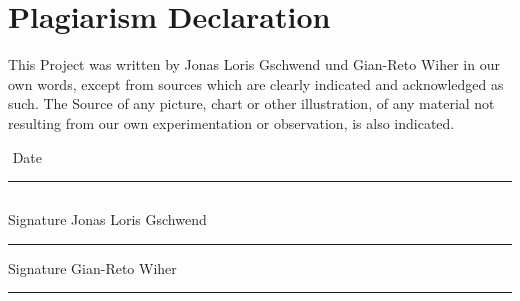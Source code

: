 \chapter*{Plagiarism Declaration}
This Project was written by Jonas Loris Gschwend und Gian-Reto Wiher in our own words, except from sources which are clearly indicated and acknowledged as such. The Source of any picture, chart or other illustration, of any material not resulting from our own experimentation or observation, is also indicated.


$ $\newline\newline\newline
Date\newline\newline
	
\rule{5cm}{.1pt}
$ $\newline\newline\newline

\begin{minipage}[t]{6cm}
	Signature Jonas Loris Gschwend\newline\newline
	
	\rule{5cm}{.1pt}
\end{minipage}\hfill
\begin{minipage}[t]{6cm}
	Signature Gian-Reto Wiher\newline\newline
		
	\rule{5cm}{.1pt}
\end{minipage}